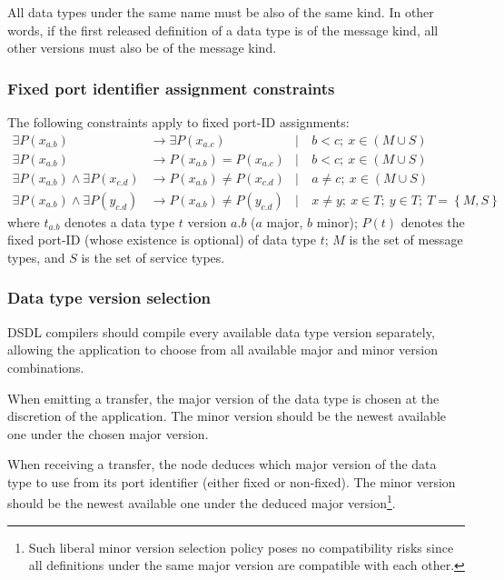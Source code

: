 All data types under the same name must be also of the same kind.
In other words, if the first released definition of a data type is of the message kind,
all other versions must also be of the message kind.

\subsubsection{Fixed port identifier assignment constraints}

The following constraints apply to fixed port-ID assignments:
\begin{align*}
    \exists P(x_{a.b})                          &\rightarrow \exists P(x_{a.c})
    &\mid&\ b < c;\ x \in (M \cup S)
    \\
    \exists P(x_{a.b})                          &\rightarrow         P(x_{a.b}) =    P(x_{a.c})
    &\mid&\ b < c;\ x \in (M \cup S)
    \\
    \exists P(x_{a.b}) \land \exists P(x_{c.d}) &\rightarrow         P(x_{a.b}) \neq P(x_{c.d})
    &\mid&\ a \neq c;\ x \in (M \cup S)
    \\
    \exists P(x_{a.b}) \land \exists P(y_{c.d}) &\rightarrow         P(x_{a.b}) \neq P(y_{c.d})
    &\mid&\ x \neq y;\ x \in T;\ y \in T;\ T = \left\{ M, S \right\}
\end{align*}
where $t_{a.b}$ denotes a data type $t$ version $a.b$ ($a$ major, $b$ minor);
$P(t)$ denotes the fixed port-ID (whose existence is optional) of data type $t$;
$M$ is the set of message types, and $S$ is the set of service types.

\subsubsection{Data type version selection}

DSDL compilers should compile every available data type version separately,
allowing the application to choose from all available major and minor version combinations.

When emitting a transfer, the major version of the data type is chosen at the discretion of the application.
The minor version should be the newest available one under the chosen major version.

When receiving a transfer, the node deduces which major version of the data type to use
from its port identifier (either fixed or non-fixed).
The minor version should be the newest available one under the deduced major version\footnote{%
Such liberal minor version selection policy poses no compatibility risks since all definitions under the same
major version are compatible with each other.}.

